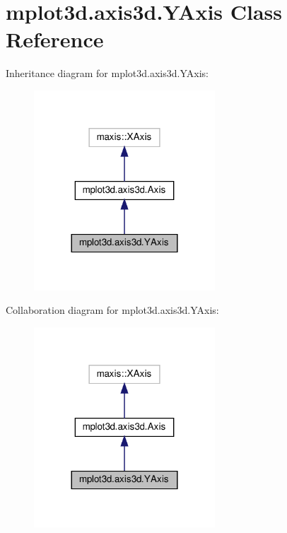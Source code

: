 \hypertarget{classmplot3d_1_1axis3d_1_1YAxis}{}\section{mplot3d.\+axis3d.\+Y\+Axis Class Reference}
\label{classmplot3d_1_1axis3d_1_1YAxis}


Inheritance diagram for mplot3d.\+axis3d.\+Y\+Axis\+:
\nopagebreak
\begin{figure}[H]
\begin{center}
\leavevmode
\includegraphics[width=192pt]{classmplot3d_1_1axis3d_1_1YAxis__inherit__graph}
\end{center}
\end{figure}


Collaboration diagram for mplot3d.\+axis3d.\+Y\+Axis\+:
\nopagebreak
\begin{figure}[H]
\begin{center}
\leavevmode
\includegraphics[width=192pt]{classmplot3d_1_1axis3d_1_1YAxis__coll__graph}
\end{center}
\end{figure}

